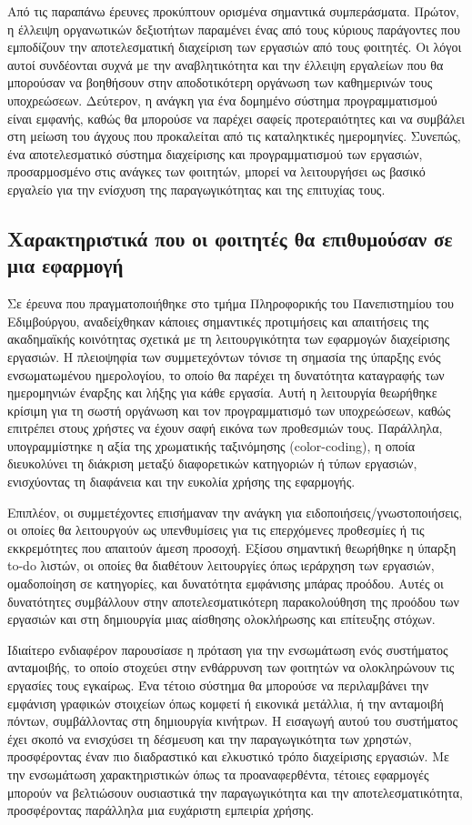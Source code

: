             Από τις παραπάνω έρευνες προκύπτουν ορισμένα σημαντικά συμπεράσματα. Πρώτον, η έλλειψη οργανωτικών δεξιοτήτων παραμένει ένας από τους κύριους παράγοντες που εμποδίζουν την αποτελεσματική διαχείριση των εργασιών από τους φοιτητές. Οι λόγοι αυτοί συνδέονται συχνά με την αναβλητικότητα και την έλλειψη εργαλείων που θα μπορούσαν να βοηθήσουν στην αποδοτικότερη οργάνωση των καθημερινών τους υποχρεώσεων. Δεύτερον, η ανάγκη για ένα δομημένο σύστημα προγραμματισμού είναι εμφανής, καθώς θα μπορούσε να παρέχει σαφείς προτεραιότητες και να συμβάλει στη μείωση του άγχους που προκαλείται από τις καταληκτικές ημερομηνίες. Συνεπώς, ένα αποτελεσματικό σύστημα διαχείρισης και προγραμματισμού των εργασιών, προσαρμοσμένο στις ανάγκες των φοιτητών, μπορεί να λειτουργήσει ως βασικό εργαλείο για την ενίσχυση της παραγωγικότητας και της επιτυχίας τους.

        \subsection{Χαρακτηριστικά που οι φοιτητές θα επιθυμούσαν σε μια εφαρμογή}
            Σε έρευνα \cite{Trujillo2020} που πραγματοποιήθηκε στο τμήμα Πληροφορικής του Πανεπιστημίου του Εδιμβούργου, αναδείχθηκαν κάποιες σημαντικές προτιμήσεις και απαιτήσεις της ακαδημαϊκής κοινότητας σχετικά με τη λειτουργικότητα των εφαρμογών διαχείρισης εργασιών. Η πλειοψηφία των συμμετεχόντων τόνισε τη σημασία της ύπαρξης ενός ενσωματωμένου ημερολογίου, το οποίο θα παρέχει τη δυνατότητα καταγραφής των ημερομηνιών έναρξης και λήξης για κάθε εργασία. Αυτή η λειτουργία θεωρήθηκε κρίσιμη για τη σωστή οργάνωση και τον προγραμματισμό των υποχρεώσεων, καθώς επιτρέπει στους χρήστες να έχουν σαφή εικόνα των προθεσμιών τους. Παράλληλα, υπογραμμίστηκε η αξία της χρωματικής ταξινόμησης (color-coding), η οποία διευκολύνει τη διάκριση μεταξύ διαφορετικών κατηγοριών ή τύπων εργασιών, ενισχύοντας τη διαφάνεια και την ευκολία χρήσης της εφαρμογής.

            Επιπλέον, οι συμμετέχοντες επισήμαναν την ανάγκη για ειδοποιήσεις/γνωστοποιήσεις, οι οποίες θα λειτουργούν ως υπενθυμίσεις για τις επερχόμενες προθεσμίες ή τις εκκρεμότητες που απαιτούν άμεση προσοχή. Εξίσου σημαντική θεωρήθηκε η ύπαρξη to-do λιστών, οι οποίες θα διαθέτουν λειτουργίες όπως ιεράρχηση των εργασιών, ομαδοποίηση σε κατηγορίες, και δυνατότητα εμφάνισης μπάρας προόδου. Αυτές οι δυνατότητες συμβάλλουν στην αποτελεσματικότερη παρακολούθηση της προόδου των εργασιών και στη δημιουργία μιας αίσθησης ολοκλήρωσης και επίτευξης στόχων.

            Ιδιαίτερο ενδιαφέρον παρουσίασε η πρόταση για την ενσωμάτωση ενός συστήματος ανταμοιβής, το οποίο στοχεύει στην ενθάρρυνση των φοιτητών να ολοκληρώνουν τις εργασίες τους εγκαίρως. Ένα τέτοιο σύστημα θα μπορούσε να περιλαμβάνει την εμφάνιση γραφικών στοιχείων όπως κομφετί ή εικονικά μετάλλια, ή την ανταμοιβή πόντων, συμβάλλοντας στη δημιουργία κινήτρων. Η εισαγωγή αυτού του συστήματος έχει σκοπό να ενισχύσει τη δέσμευση και την παραγωγικότητα των χρηστών, προσφέροντας έναν πιο διαδραστικό και ελκυστικό τρόπο διαχείρισης εργασιών. Με την ενσωμάτωση χαρακτηριστικών όπως τα προαναφερθέντα, τέτοιες εφαρμογές μπορούν να βελτιώσουν ουσιαστικά την παραγωγικότητα και την αποτελεσματικότητα, προσφέροντας παράλληλα μια ευχάριστη εμπειρία χρήσης.